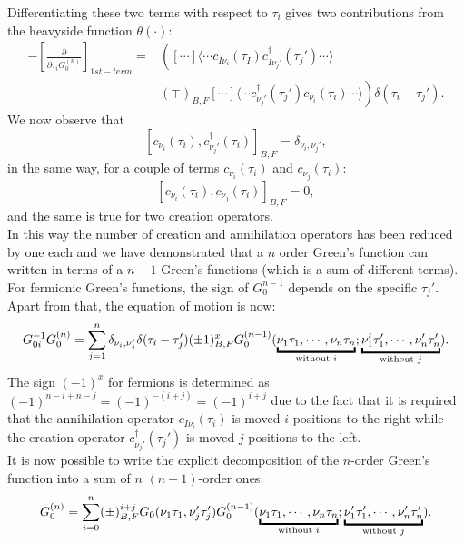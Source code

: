 Differentiating these two terms with respect to $\tau_i$ gives two contributions from the heavyside function $\theta(\cdot)$:
\begin{equation}
\begin{split}
    -\left[\frac{\partial}{\partial\tau_iG_0^{(n)}}\right]_{1st-term}=&\left([\cdots]\langle \cdots c_{I\nu_i}(\tau_I)c^\dagger_{I\nu_j'}(\tau_j')\cdots\rangle \right.\\
    &\left. (\mp)_{B,F}[\cdots]\langle \cdots c^\dagger_{\nu_j'}(\tau_j')c_{\nu_i}(\tau_i)\cdots\rangle \right)\delta(\tau_i-\tau_j').
\end{split}
\end{equation}
We now observe that
\begin{equation}
    \left[c_{\nu_i}(\tau_i),c^\dagger_{\nu_j'}(\tau_i)\right]_{B,F}=\delta_{\nu_i,\nu_j'},
\end{equation}
in the same way, for a couple of terms $c_{\nu_i}(\tau_i)$ and $c_{\nu_j}(\tau_i)$:
\begin{equation}
    \left[c_{\nu_i}(\tau_i),c_{\nu_j}(\tau_i)\right]_{B,F}=0,
\end{equation}
and the same is true for two creation operators.\\
In this way the number of creation and annihilation operators has been reduced by one each and we have demonstrated that a $n$ order Green's function 
can written in terms of a $n-1$ Green's functions (which is a sum of different terms). For fermionic Green's functions, the sign of $G_0^{n-1}$ 
depends on the specific $\tau_j'$. Apart from that, the equation of motion is now:
\begin{equation}
    G^{-1}_{0i}G^{(n)}_0=\sum_{j=1}^n\delta_{\nu_i,\nu_j'}\delta(\tau_i-\tau_j')(\pm1)^x_{B,F}G_0^{(n-1)}(\underbracket[1.5pt][3pt]{\nu_1\tau_1,\cdots,\nu_n\tau_n}_{\mathclap{\text{without $i$}}};\underbracket[1.5pt][3pt]{\nu_1'\tau_1',\cdots,\nu_n'\tau_n'}_{\mathclap{\text{without $j$}}}).
\end{equation}
The sign $(-1)^x$ for fermions is determined as $(-1)^{n-i+n-j}=(-1)^{-(i+j)}=(-1)^{i+j}$ due to the fact that it is required that the annihilation operator $c_{I\nu_i}(\tau_i)$ 
is moved $i$ positions to the right while the creation operator $c^\dagger_{\nu_j'}(\tau_j')$ is moved $j$ positions to the left.\\
It is now possible to write the explicit decomposition of the $n$-order Green's function into a sum of $n$ $(n-1)$-order ones:
\begin{equation}
    G_0^{(n)}=\sum_{i=0}^{n}(\pm)^{i+j}_{B,F}G_0(\nu_1\tau_1,\nu_j'\tau_j')G_0^{(n-1)}(\underbracket[1.5pt][3pt]{\nu_1\tau_1,\cdots,\nu_n\tau_n}_{\mathclap{\text{without $i$}}};\underbracket[1.5pt][3pt]{\nu_1'\tau_1',\cdots,\nu_n'\tau_n'}_{\mathclap{\text{without $j$}}}).
\end{equation}
